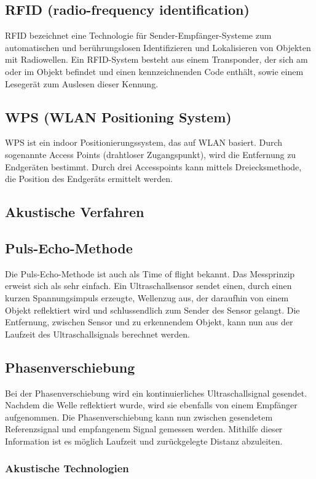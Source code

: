     \subsection*{RFID (radio-frequency identification)}
    RFID bezeichnet eine Technologie für Sender-Empfänger-Systeme zum automatischen und berührungslosen Identifizieren und Lokalisieren von Objekten mit Radiowellen. Ein RFID-System besteht aus einem Transponder, der sich am oder im Objekt befindet und einen kennzeichnenden Code enthält, sowie einem Lesegerät zum Auslesen dieser Kennung.
    \subsection*{WPS (WLAN Positioning System)}
    WPS ist ein indoor Positionierungssystem, das auf WLAN basiert. Durch sogenannte  Access Points (drahtloser Zugangspunkt), wird die Entfernung zu Endgeräten bestimmt. Durch drei Accesspoints kann mittels Dreiecksmethode, die Position des Endgeräts ermittelt werden.

    \subsection{Akustische Verfahren}
    \subsection*{Puls-Echo-Methode}
    Die Puls-Echo-Methode\cite{akustischeverfahren} ist auch als Time of flight bekannt.
    Das Messprinzip erweist sich als sehr einfach. Ein Ultraschallsensor sendet einen, durch einen kurzen Spannungsimpuls erzeugte, Wellenzug aus, der daraufhin von einem Objekt reflektiert wird und schlussendlich zum Sender des Sensor gelangt. Die Entfernung, zwischen Sensor und zu erkennendem Objekt, kann nun aus der Laufzeit des Ultraschallsignals berechnet werden. 
    \subsection*{Phasenverschiebung}
    Bei der Phasenverschiebung\cite{akustischeverfahren} wird ein kontinuierliches Ultraschallsignal gesendet. Nachdem die Welle reflektiert wurde, wird sie ebenfalls von einem Empfänger aufgenommen. Die Phasenverschiebung kann nun zwischen gesendetem Referenzsignal und empfangenem Signal gemessen werden. Mithilfe dieser Information ist es möglich Laufzeit und zurückgelegte Distanz abzuleiten. 

    \subsubsection{Akustische Technologien}
